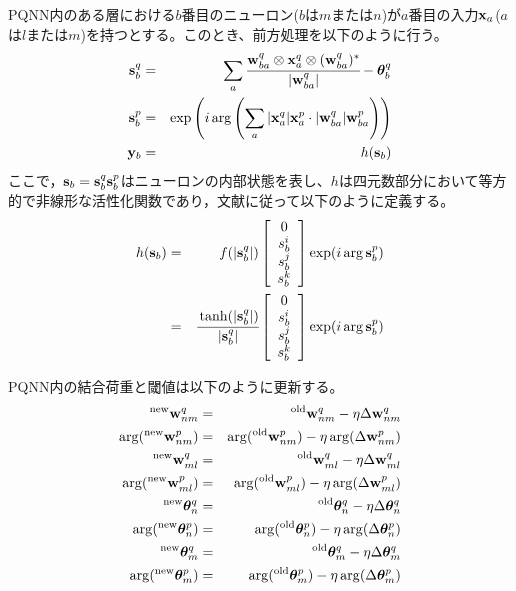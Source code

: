 \documentclass[a4j, twocolumn]{jsarticle}
\begin{document}
PQNN内のある層における$b$番目のニューロン($b$は$m$または$n$)が$a$番目の入力${\bf x}_{a}$($a$は$l$または$m$)を持つとする。このとき、前方処理を以下のように行う。
\begin{eqnarray}
	{\bf s}^q_{b} &=& \sum_{a} \cfrac{{\bf w}_{ba}^{q} \otimes {\bf x}^q_{a} \otimes ({\bf w}^{q}_{ba})^{*}}{{|{\bf w}^q_{ba}|}} - \bm{\theta}^q_{b}\\
	{\bf s}^p_{b} &=& \exp\left(i\arg\left(\sum_{a}|{\bf x}_{a}^{q}|{\bf x}^p_{a} \cdot |{\bf w}_{ba}^{q}|{\bf w}^p_{ba}\right)\right)\\
	{\bf y}_{b} &=& h({\bf s}_{b})
\end{eqnarray}
ここで，${\bf s}_{b}={\bf s}^q_{b}{\bf s}^p_{b}$はニューロンの内部状態を表し、$h$は四元数部分において等方的で非線形な活性化関数であり，文献\cite{kinugawa2016proposal}に従って以下のように定義する。
\begin{eqnarray}
	h({\bf s}_{b}) &=& f(|{\bf s}^q_{b}|)\left[\begin{array}{ccc}0\\s^{i}_{b}\\s^{j}_{b}\\s^{k}_{b}\end{array}\right]\exp(i\arg{{\bf s}^{p}_{b}}) \nonumber \\
	&=& \cfrac{\tanh(|{\bf s}^q_{b}|)}{|{\bf s}^q_{b}|}\left[\begin{array}{ccc}0\\s^{i}_{b}\\s^{j}_{b}\\s^{k}_{b}\end{array}\right]\exp(i\arg{{\bf s}^{p}_{b}})
\end{eqnarray}

PQNN内の結合荷重と閾値は以下のように更新する。
\begin{eqnarray}
	{}^{\rm new}{\bf w}_{nm}^{q} &=& {}^{\rm old}{\bf w}_{nm}^{q} - \eta \Delta{\bf w}_{nm}^{q}\\
	\arg({}^{\rm new}{\bf w}_{nm}^{p}) &=& \arg({}^{\rm old}{\bf w}_{nm}^{p}) - \eta \arg(\Delta{\bf w}_{nm}^{p})\\
	{}^{\rm new}{\bf w}_{ml}^{q} &=& {}^{\rm old}{\bf w}_{ml}^{q} - \eta \Delta{\bf w}_{ml}^{q}\\
	\arg({}^{\rm new}{\bf w}_{ml}^{p}) &=& \arg({}^{\rm old}{\bf w}_{ml}^{p}) - \eta \arg(\Delta{\bf w}_{ml}^{p})\\
	{}^{\rm new}\bm{\theta}_{n}^{q} &=& {}^{\rm old}\bm{\theta}_{n}^{q} - \eta \Delta\bm{\theta}_{n}^{q}\\
	\arg({}^{\rm new}\bm{\theta}_{n}^{p}) &=& \arg({}^{\rm old}\bm{\theta}_{n}^{p}) - \eta \arg(\Delta\bm{\theta}_{n}^{p})\\
	{}^{\rm new}\bm{\theta}_{m}^{q} &=& {}^{\rm old}\bm{\theta}_{m}^{q} - \eta \Delta\bm{\theta}_{m}^{q}\\
	\arg({}^{\rm new}\bm{\theta}_{m}^{p}) &=& \arg({}^{\rm old}\bm{\theta}_{m}^{p}) - \eta \arg(\Delta\bm{\theta}_{m}^{p})
\end{eqnarray}
\end{document}

